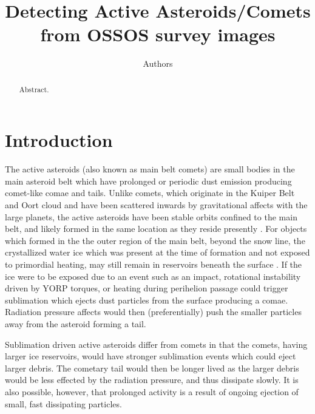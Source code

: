 \documentclass[iop,apj]{emulateapj}
\begin{document}
\title{Detecting Active Asteroids/Comets from OSSOS survey images}
\author{Authors}

\begin{abstract}
Abstract.
\end{abstract}

\maketitle


\section{Introduction}
The active asteroids (also known as main belt comets) are small bodies in the main asteroid belt which have prolonged or periodic dust emission producing comet-like comae and tails. Unlike comets, which originate in the Kuiper Belt and Oort cloud and have been scattered inwards by gravitational affects with the large planets, the active asteroids have been stable orbits confined to the main belt, and likely formed in the same location as they reside presently \cite{pop of comets 2006}. For objects which formed in the the outer region of the main belt, beyond the snow line, the crystallized water ice which was present at the time of formation and not exposed to primordial heating, may still remain in reservoirs beneath the surface \citep{limits on size, prialnik 2009}. If the ice were to be exposed due to an event such as an impact, rotational instability driven by YORP torques, or heating during perihelion passage could trigger sublimation which ejects dust particles from the surface producing a comae. Radiation pressure affects would then (preferentially) push the smaller particles away from the asteroid forming a tail.

Sublimation driven active asteroids differ from comets in that the comets, having larger ice reservoirs, would have stronger sublimation events which could eject larger debris. The cometary tail would then be longer lived as the larger debris would be less effected by the radiation pressure, and thus dissipate slowly. It is also possible, however, that prolonged activity is a result of ongoing ejection of small, fast dissipating particles. \cite{cite this}
\end{document}
